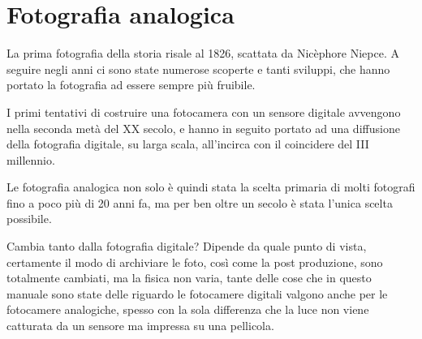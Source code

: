 \chapter{Fotografia analogica} \label{ch:analogica}

La prima fotografia della storia risale al 1826, scattata da Nicèphore Niepce.
A seguire negli anni ci sono state numerose scoperte e tanti sviluppi, che hanno portato la fotografia ad essere sempre più fruibile.

I primi tentativi di costruire una fotocamera con un sensore digitale avvengono nella seconda metà del XX secolo, e hanno in seguito portato ad una diffusione della fotografia digitale, su larga scala, all'incirca con il coincidere del III millennio.

Le fotografia analogica non solo è quindi stata la scelta primaria di molti fotografi fino a poco più di 20 anni fa, ma per ben oltre un secolo è stata l'unica scelta possibile.

Cambia tanto dalla fotografia digitale? Dipende da quale punto di vista, certamente il modo di archiviare le foto, così come la post produzione, sono totalmente cambiati, ma la fisica non varia, tante delle cose che in questo manuale sono state delle riguardo le fotocamere digitali valgono anche per le fotocamere analogiche, spesso con la sola differenza che la luce non viene catturata da un sensore ma impressa su una pellicola.

\pagebreak